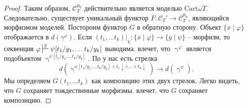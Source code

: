 \documentclass[reqno]{amsart}
\theoremstyle{definition}
\theoremstyle{remark}
\newcommand{\cat}[1]{\mathcal{#1}}
\begin{document}
\begin{proof}
Таким образом, $\cat{C}_T^{\aleph_0}$ действительно является моделью $\mathrm{Cart} \overline{\omega} T$.
Следовательно, существует уникальный функтор $F : \cat{C}_T' \to \cat{C}_T^{\aleph_0}$, являющийся морфизмом моделей.
Постороим функтор $G$ в обратную сторону.
Объект $\{ \overline{x} \mid \varphi \}$ отображается в $d(\gamma^\varphi)$.
Если $(t_1, \ldots t_k)|_\chi : \{ \overline{x} \mid \varphi \} \to \{ \overline{y} \mid \psi \}$ -- морфизм, то секвенция $\varphi \sststile{}{\overline{x}} \psi[t_1/y_1, \ldots t_k/y_k]$ выводима.
 влечет, что $\upgamma^\varphi$ является подобъектом $\upgamma^{\psi[t_1/y_1, \ldots t_k/y_k]}$.
По  у нас есть стрелка
\[ d(\upgamma^{\psi[t_1/y_1, \ldots t_k/y_k] \land t_1\!\downarrow \land \ldots \land t_k\!\downarrow}) \to d(\upgamma^\psi). \]
Мы определяем $G(t_1, \ldots t_k)$ как композицию этих двух стрелок.
Легко видеть, что $G$ сохраняет тождественные морфизмы.
 влечет, что $G$ сохраняет композицию.


\end{proof}
\end{document}
